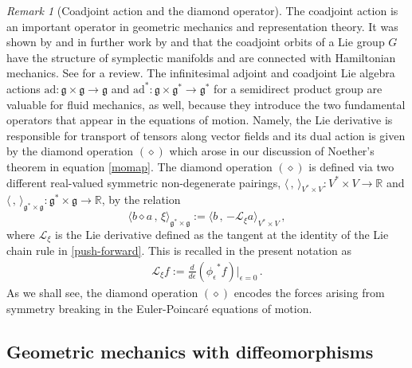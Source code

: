 \documentclass[11pt, oneside]{article}   	%
\numberwithin{equation}{section}
\theoremstyle{plain}
\theoremstyle{definition}
\theoremstyle{remark}
\newtheorem{remark}[theorem]{Remark}
\newcommand{\<}{\langle}
\renewcommand{\>}{\rangle}
\newcommand{\scp}[2]{{\big\langle {#1}\, , \, {#2}\big\rangle}}
\begin{document}
\begin{remark}[Coadjoint action and the diamond operator]
The coadjoint action is an important operator in geometric mechanics and representation theory. It was shown by \cite{kirillov1962unitary} and in further work by \cite{kostant1970quantization} and \cite{souriau1970structure} that the coadjoint orbits of a Lie group $G$ have the structure of symplectic manifolds and are connected with Hamiltonian mechanics. See \cite{kirillov1999merits} for a review. The infinitesimal adjoint and coadjoint Lie algebra actions $\mathrm{ad}: \mathfrak{g}\times \mathfrak{g}\to \mathfrak{g}$ and $\mathrm{ad}^*: \mathfrak{g}\times \mathfrak{g}^*\to \mathfrak{g}^*$ for a semidirect product group are valuable for fluid mechanics, as well, because they introduce the two fundamental operators that appear in the equations of motion. Namely, the Lie derivative is responsible for transport of tensors along vector fields and its dual action is given by the diamond operation $(\diamond)$ which arose in our discussion of Noether's theorem in equation \eqref{momap}. The diamond operation $(\diamond)$ is defined via two different real-valued symmetric non-degenerate pairings, $\scp{}{}_{V^*\times V}: V^*\times V \to \mathbb{R}$ and $\scp{}{}_{\mathfrak{g}^*\times\mathfrak{g}}: \mathfrak{g}^*\times\mathfrak{g}\to \mathbb{R}$, by the relation
%
\begin{equation}\label{def: diamond}
\scp{b\diamond a}{\xi}_{\mathfrak{g}^*\times\mathfrak{g}} := \scp{b}{- \mathcal{L}_\xi a}_{V^*\times V}
\,,\end{equation}
where  $ \mathcal{L}_\xi$ is the Lie derivative defined as the tangent at the identity of the Lie chain rule in \eqref{push-forward}. This is recalled in the present notation as 
\begin{align}
  \mathcal{L}_\xi f := \frac{d}{d\epsilon}({\phi_\epsilon}^* f )\Big|_{\epsilon=0} \,.
\label{def: LieDerivative2}
\end{align}
As we shall see, the diamond operation $(\diamond)$ encodes the forces arising from symmetry breaking in the Euler-Poincar\'e equations of motion.     
\end{remark}


\subsection{Geometric mechanics with diffeomorphisms}
\end{document}
